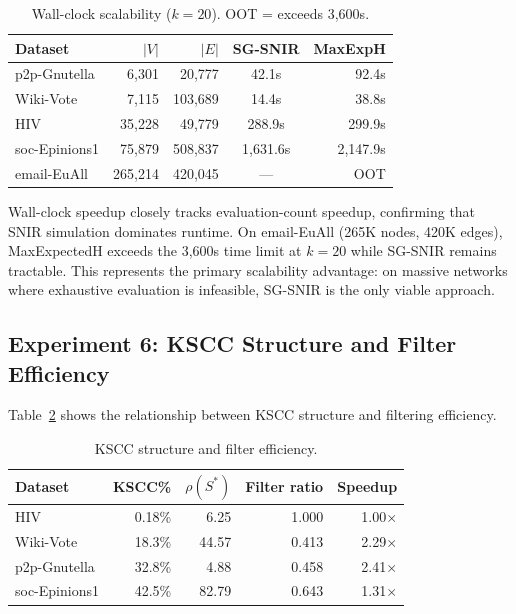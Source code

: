 \documentclass[conference]{IEEEtran}
\begin{document}
\begin{table}[htbp]
\caption{Wall-clock scalability ($k=20$). OOT = exceeds 3{,}600s.}
\label{tab:scalability}
\centering
\begin{tabular}{lrrcr}
\hline
\textbf{Dataset} & $|V|$ & $|E|$ & \textbf{SG-SNIR} & \textbf{MaxExpH} \\
\hline
p2p-Gnutella & 6{,}301 & 20{,}777 & 42.1s & 92.4s \\
Wiki-Vote & 7{,}115 & 103{,}689 & 14.4s & 38.8s \\
HIV & 35{,}228 & 49{,}779 & 288.9s & 299.9s \\
soc-Epinions1 & 75{,}879 & 508{,}837 & 1{,}631.6s & 2{,}147.9s \\
email-EuAll & 265{,}214 & 420{,}045 & --- & OOT \\
\hline
\end{tabular}
\end{table}

Wall-clock speedup closely tracks evaluation-count speedup, confirming that SNIR simulation dominates runtime. On email-EuAll (265K nodes, 420K edges), MaxExpectedH exceeds the 3{,}600s time limit at $k=20$ while SG-SNIR remains tractable. This represents the primary scalability advantage: on massive networks where exhaustive evaluation is infeasible, SG-SNIR is the only viable approach.

\subsection{Experiment 6: KSCC Structure and Filter Efficiency}

Table~\ref{tab:kscc} shows the relationship between KSCC structure and filtering efficiency.

\begin{table}[htbp]
\caption{KSCC structure and filter efficiency.}
\label{tab:kscc}
\centering
\begin{tabular}{lrrrr}
\hline
\textbf{Dataset} & \textbf{KSCC\%} & $\rho(S^*)$ & \textbf{Filter ratio} & \textbf{Speedup} \\
\hline
HIV & 0.18\% & 6.25 & 1.000 & 1.00$\times$ \\
Wiki-Vote & 18.3\% & 44.57 & 0.413 & 2.29$\times$ \\
p2p-Gnutella & 32.8\% & 4.88 & 0.458 & 2.41$\times$ \\
soc-Epinions1 & 42.5\% & 82.79 & 0.643 & 1.31$\times$ \\
\hline
\end{tabular}
\end{table}
\end{document}
